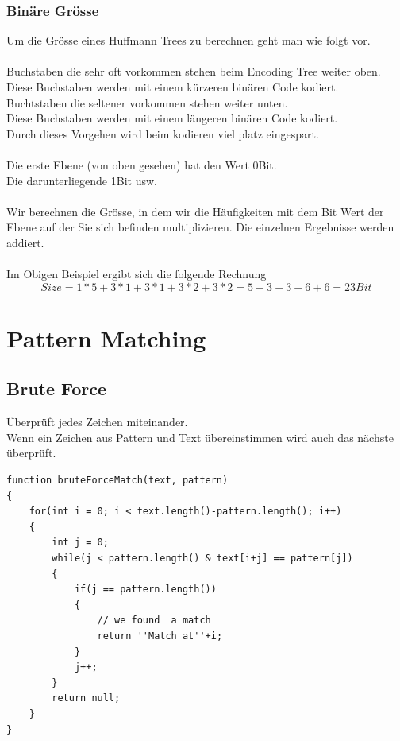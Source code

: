 \documentclass[a4paper,10pt]{report}
\begin{document}
\subsubsection{Binäre Grösse}
Um die Grösse eines Huffmann Trees zu berechnen geht man wie folgt vor.\\
\\
Buchstaben die sehr oft vorkommen stehen beim Encoding Tree weiter oben.\\
Diese Buchstaben werden mit einem kürzeren binären Code kodiert.\\
Buchtstaben die seltener vorkommen stehen weiter unten.\\
Diese Buchstaben werden mit einem längeren binären Code kodiert.\\
Durch dieses Vorgehen wird beim kodieren viel platz eingespart.\\
\\
Die erste Ebene (von oben gesehen) hat den Wert 0Bit.\\
Die darunterliegende 1Bit usw.\\
\\
Wir berechnen die Grösse, in dem wir die Häufigkeiten mit dem Bit Wert der Ebene auf der Sie sich befinden multiplizieren. Die einzelnen Ergebnisse werden addiert.\\
\\
Im Obigen Beispiel ergibt sich die folgende Rechnung
\begin{equation*}Size = 1*5+3*1+3*1+3*2+3*2 = 5+3+3+6+6 = 23Bit\end{equation*}
\newpage
\section{Pattern Matching}
\subsection{Brute Force}
Überprüft jedes Zeichen miteinander.\\
Wenn ein Zeichen aus Pattern und Text übereinstimmen wird auch das nächste überprüft.\\
\begin{lstlisting}
function bruteForceMatch(text, pattern)
{
	for(int i = 0; i < text.length()-pattern.length(); i++)
	{
		int j = 0;
		while(j < pattern.length() & text[i+j] == pattern[j])
		{
			if(j == pattern.length())
			{
				// we found  a match
				return ''Match at''+i;
			}
			j++;
		}
		return null;
	}
}
\end{lstlisting}
\newpage
\end{document}
